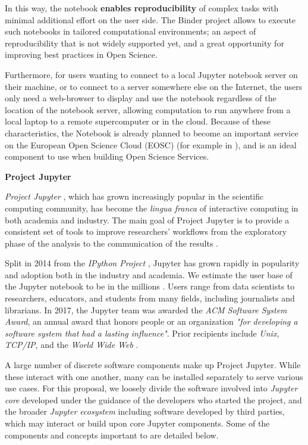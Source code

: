 In this way, the notebook \textbf{enables reproducibility} of complex tasks
with minimal additional effort on the user side.
The Binder project allows to execute such notebooks in
tailored computational environments; an aspect of reproducibility that
is not widely supported yet,
and a great opportunity for improving best practices in Open Science.

Furthermore, for users wanting to connect
to a local Jupyter notebook server on their machine, or to connect to
a server somewhere else on the Internet, the users only need a
web-browser to display and use the notebook regardless of the location
of the notebook server,
allowing computation to run anywhere from a local laptop to a remote supercomputer or in the cloud.
Because of these characteristics,
the Notebook is already planned to become an
important service on the European Open Science Cloud (EOSC) (for
example in \cite{panosc}),
and is an ideal component to use when building Open Science Services.

\medskip\noindent\textbf{Project Jupyter}

\emph{Project Jupyter} \cite{Jupyter}, which has grown increasingly popular in the scientific
computing community, has become the \emph{lingua franca} of interactive
computing in both academia and industry. The main goal of Project Jupyter
is to provide a consistent set of tools to improve researchers'
workflows from the exploratory phase of the analysis to the communication
of the results \cite{Kluyver2016}.

Split in 2014 from the \emph{IPython Project} \cite{IPython}, Jupyter has grown rapidly in
popularity and adoption both in the industry and academia. We estimate the user
base of the Jupyter notebook to be in the millions \cite{jupyter-grant}. Users range from data
scientists to researchers, educators, and students from many fields,
including journalists and librarians. In 2017, the Jupyter
team was awarded the \emph{ACM Software System Award}, an annual award that
honors people or an organization \emph{"for developing a software system that had a
lasting influence"}. Prior recipients include \emph{Unix}, \emph{TCP/IP}, and
the \emph{World Wide Web} \cite{acm-award}.

A large number of discrete software components make up Project Jupyter.
While these interact with one another, many can be installed separately
to serve various use cases. For this proposal, we loosely divide the
software involved into \emph{Jupyter core} developed under the guidance
of the developers who started the project, and the broader \emph{Jupyter
ecosystem} including software developed by third parties,
which may interact or build upon core Jupyter components.
Some of the components and concepts important to \TheProject are detailed below.

